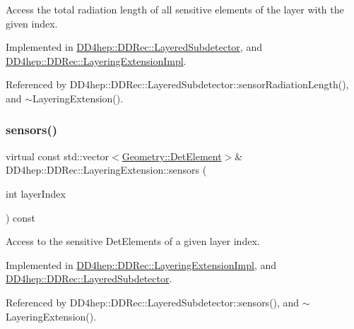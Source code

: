 Access the total radiation length of all sensitive elements of the layer with the given index. 



Implemented in \hyperlink{class_d_d4hep_1_1_d_d_rec_1_1_layered_subdetector_afa7d4fe8408b38a84c11900e5c080979}{D\+D4hep\+::\+D\+D\+Rec\+::\+Layered\+Subdetector}, and \hyperlink{class_d_d4hep_1_1_d_d_rec_1_1_layering_extension_impl_aa36bb3d1c021159a5d46f84ff84c7a11}{D\+D4hep\+::\+D\+D\+Rec\+::\+Layering\+Extension\+Impl}.



Referenced by D\+D4hep\+::\+D\+D\+Rec\+::\+Layered\+Subdetector\+::sensor\+Radiation\+Length(), and $\sim$\+Layering\+Extension().

\hypertarget{class_d_d4hep_1_1_d_d_rec_1_1_layering_extension_a832e6f67c9e507b89f8f41d0a5cc0025}{}\label{class_d_d4hep_1_1_d_d_rec_1_1_layering_extension_a832e6f67c9e507b89f8f41d0a5cc0025} 
\subsubsection{\texorpdfstring{sensors()}{sensors()}}
{\footnotesize\ttfamily virtual const std\+::vector$<$\hyperlink{class_d_d4hep_1_1_geometry_1_1_det_element}{Geometry\+::\+Det\+Element}$>$\& D\+D4hep\+::\+D\+D\+Rec\+::\+Layering\+Extension\+::sensors (\begin{DoxyParamCaption}\item[{int}]{layer\+Index }\end{DoxyParamCaption}) const\hspace{0.3cm}{\ttfamily [pure virtual]}}



Access to the sensitive Det\+Elements of a given layer index. 



Implemented in \hyperlink{class_d_d4hep_1_1_d_d_rec_1_1_layering_extension_impl_a3869b997ee9ebc7f63bef3ad50000a6a}{D\+D4hep\+::\+D\+D\+Rec\+::\+Layering\+Extension\+Impl}, and \hyperlink{class_d_d4hep_1_1_d_d_rec_1_1_layered_subdetector_a432172e452c14a9ad751b46b6cbcceb9}{D\+D4hep\+::\+D\+D\+Rec\+::\+Layered\+Subdetector}.



Referenced by D\+D4hep\+::\+D\+D\+Rec\+::\+Layered\+Subdetector\+::sensors(), and $\sim$\+Layering\+Extension().

